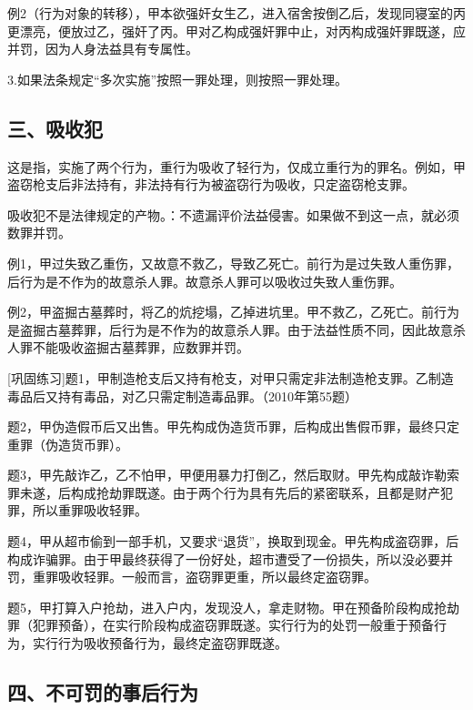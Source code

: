 例2（行为对象的转移），甲本欲强奸女生乙，进入宿舍按倒乙后，发现同寝室的丙更漂亮，便放过乙，强奸了丙。甲对乙构成强奸罪中止，对丙构成强奸罪既遂，应并罚，因为人身法益具有专属性。

3.如果法条规定“多次实施”按照一罪处理，则按照一罪处理。


\subsection*{三、吸收犯}

这是指，实施了两个行为，重行为吸收了轻行为，仅成立重行为的罪名。例如，甲盗窃枪支后非法持有，非法持有行为被盗窃行为吸收，只定盗窃枪支罪。

吸收犯不是法律规定的产物。：不遗漏评价法益侵害。如果做不到这一点，就必须数罪并罚。

例1，甲过失致乙重伤，又故意不救乙，导致乙死亡。前行为是过失致人重伤罪，后行为是不作为的故意杀人罪。故意杀人罪可以吸收过失致人重伤罪。

例2，甲盗掘古墓葬时，将乙的炕挖塌，乙掉进坑里。甲不救乙，乙死亡。前行为是盗掘古墓葬罪，后行为是不作为的故意杀人罪。由于法益性质不同，因此故意杀人罪不能吸收盗掘古墓葬罪，应数罪并罚。

[巩固练习]题1，甲制造枪支后又持有枪支，对甲只需定非法制造枪支罪。乙制造毒品后又持有毒品，对乙只需定制造毒品罪。（2010年第55题）

题2，甲伪造假币后又出售。甲先构成伪造货币罪，后构成出售假币罪，最终只定重罪（伪造货币罪）。

题3，甲先敲诈乙，乙不怕甲，甲便用暴力打倒乙，然后取财。甲先构成敲诈勒索罪未遂，后构成抢劫罪既遂。由于两个行为具有先后的紧密联系，且都是财产犯罪，所以重罪吸收轻罪。

题4，甲从超市偷到一部手机，又要求“退货”，换取到现金。甲先构成盗窃罪，后构成诈骗罪。由于甲最终获得了一份好处，超市遭受了一份损失，所以没必要并罚，重罪吸收轻罪。一般而言，盗窃罪更重，所以最终定盗窃罪。

题5，甲打算入户抢劫，进入户内，发现没人，拿走财物。甲在预备阶段构成抢劫罪（犯罪预备），在实行阶段构成盗窃罪既遂。实行行为的处罚一般重于预备行为，实行行为吸收预备行为，最终定盗窃罪既遂。

\subsection*{四、不可罚的事后行为}

